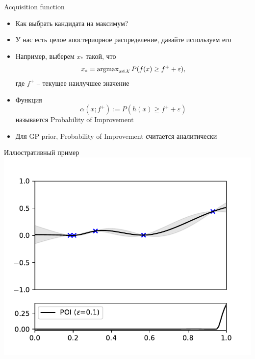 \documentclass[fullscreen=true, bookmarks=true, hyperref={pdfencoding=unicode}]{beamer}
\begin{document}
\begin{frame}{Acquisition function}

    \begin{itemize}
        \item<1-> Как выбрать кандидата на максимум?
        \item<2-> У нас есть целое апостериорное распределение, давайте используем его
        \item<3-> Например, выберем $x_*$ такой, что
        \[
            x_* = \operatorname{argmax}_{x \in \mathcal{X}} P(f(x) \geq f^{+} + \varepsilon),
        \]
        где $f^{+}$ -- текущее наилучшее значение
        \item<4-> Функция
        \[
            \alpha(x; f^{+}) := P(h(x) \geq f^{+} + \varepsilon)
        \]
        называется Probability of Improvement
        \item<5-> Для GP prior, Probability of Improvement считается аналитически
    \end{itemize}

\end{frame}

\begin{frame}{Иллюстративный пример}
    \includegraphics[width=\textwidth]{03_bayesopt_gp_0_poi.pdf}
\end{frame}
\end{document}

